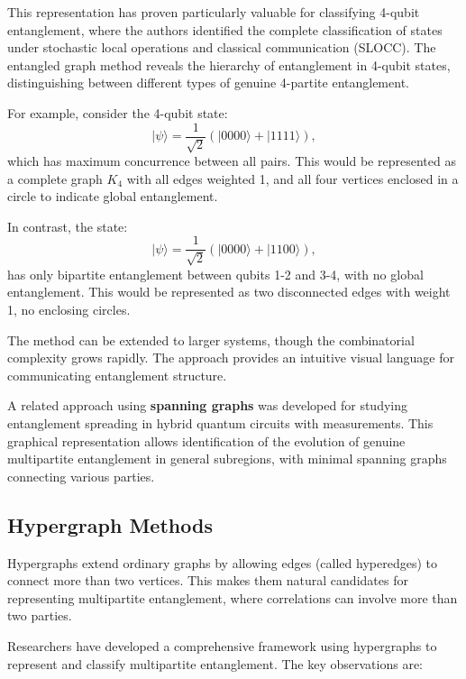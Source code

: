 \documentclass[%
 amsmath,amssymb,
 aps,
rmp,
]{revtex4-2}
\begin{document}
This representation has proven particularly valuable for classifying 4-qubit entanglement, where the authors identified the complete classification of states under stochastic local operations and classical communication (SLOCC). The entangled graph method reveals the hierarchy of entanglement in 4-qubit states, distinguishing between different types of genuine 4-partite entanglement.

For example, consider the 4-qubit state:
\begin{equation}
	|\psi\rangle = \frac{1}{\sqrt{2}}(|0000\rangle + |1111\rangle),
\end{equation}
which has maximum concurrence between all pairs. This would be represented as a complete graph $K_4$ with all edges weighted 1, and all four vertices enclosed in a circle to indicate global entanglement.

In contrast, the state:
\begin{equation}
	|\psi\rangle = \frac{1}{\sqrt{2}}(|0000\rangle + |1100\rangle),
\end{equation}
has only bipartite entanglement between qubits 1-2 and 3-4, with no global entanglement. This would be represented as two disconnected edges with weight 1, no enclosing circles.

The method can be extended to larger systems, though the combinatorial complexity grows rapidly. The approach provides an intuitive visual language for communicating entanglement structure.

A related approach using \textbf{spanning graphs} was developed for studying entanglement spreading in hybrid quantum circuits with measurements. This graphical representation allows identification of the evolution of genuine multipartite entanglement in general subregions, with minimal spanning graphs connecting various parties.

\subsection{Hypergraph Methods}
\label{sec:hypergraphs}

Hypergraphs extend ordinary graphs by allowing edges (called hyperedges) to connect more than two vertices. This makes them natural candidates for representing multipartite entanglement, where correlations can involve more than two parties.

Researchers have developed a comprehensive framework using hypergraphs to represent and classify multipartite entanglement. The key observations are:
\end{document}
